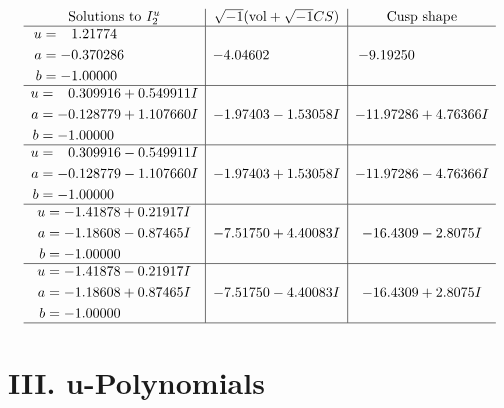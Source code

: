 \documentclass[1p]{elsarticle_modified}
\theoremstyle{definition}
\newcommand{\I}{\sqrt{-1}}
\begin{document}
$$\begin{array}{c|c|c}  
\text{Solutions to }I^u_{2}& \I (\text{vol} + \sqrt{-1}CS) & \text{Cusp shape}\\
 \hline 
\begin{aligned}
u &= \phantom{-}1.21774\phantom{ +0.000000I} \\
a &= -0.370286\phantom{ +0.000000I} \\
b &= -1.00000\phantom{ +0.000000I}\end{aligned}
 & -4.04602\phantom{ +0.000000I} & -9.19250\phantom{ +0.000000I} \\ \hline\begin{aligned}
u &= \phantom{-}0.309916 + 0.549911 I \\
a &= -0.128779 + 1.107660 I \\
b &= -1.00000\phantom{ +0.000000I}\end{aligned}
 & -1.97403 - 1.53058 I & -11.97286 + 4.76366 I \\ \hline\begin{aligned}
u &= \phantom{-}0.309916 - 0.549911 I \\
a &= -0.128779 - 1.107660 I \\
b &= -1.00000\phantom{ +0.000000I}\end{aligned}
 & -1.97403 + 1.53058 I & -11.97286 - 4.76366 I \\ \hline\begin{aligned}
u &= -1.41878 + 0.21917 I \\
a &= -1.18608 - 0.87465 I \\
b &= -1.00000\phantom{ +0.000000I}\end{aligned}
 & -7.51750 + 4.40083 I & -16.4309 - 2.8075 I \\ \hline\begin{aligned}
u &= -1.41878 - 0.21917 I \\
a &= -1.18608 + 0.87465 I \\
b &= -1.00000\phantom{ +0.000000I}\end{aligned}
 & -7.51750 - 4.40083 I & -16.4309 + 2.8075 I\\
 \hline 
 \end{array}$$\newpage
\newpage\renewcommand{\arraystretch}{1}
\centering \section*{ III. u-Polynomials}
\end{document}
